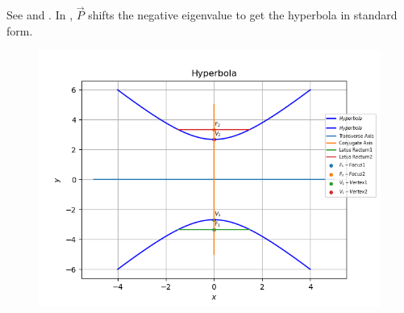 See 
and 
.
In
, $\vec{P}$ shifts the negative eigenvalue 
to get the hyperbola in standard form.
\begin{figure}[!h]
	\begin{center} 
	    \includegraphics[width=\columnwidth]{chapters/11/11/4/5/figs/hyperbola.png}
	\end{center}
\caption{}
\label{fig:chapters/11/11/4/5/1}
\end{figure}

